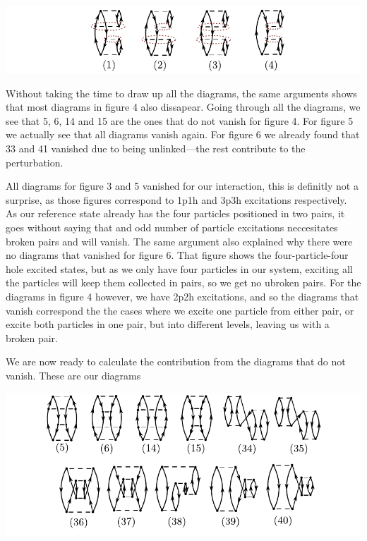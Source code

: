 \documentclass[a4paper, 11pt, notitlepage, english]{article}
\begin{document}
\includegraphics[width=\textwidth]{project2_6}

Without taking the time to draw up all the diagrams, the same arguments shows that most diagrams in figure 4 also dissapear. Going through all the diagrams, we see that 5, 6, 14 and 15 are the ones that do not vanish for figure 4. For figure 5 we actually see that all diagrams vanish again. For figure 6 we already found that 33 and 41 vanished due to being unlinked---the rest contribute to the perturbation.

All diagrams for figure 3 and 5 vanished for our interaction, this is definitly not a surprise, as those figures correspond to 1p1h and 3p3h excitations respectively. As our reference state already has the four particles positioned in two pairs, it goes without saying that and odd number of particle excitations neccesitates broken pairs and will vanish. The same argument also explained why there were no diagrams that vanished for figure 6. That figure shows the four-particle-four hole excited states, but as we only have four particles in our system, exciting all the particles will keep them collected in pairs, so we get no ubroken pairs. For the diagrams in figure 4 however, we have 2p2h excitations, and so the diagrams that vanish correspond the the cases where we excite one particle from either pair, or excite both particles in one pair, but into different levels, leaving us with a broken pair.

\clearpage

We are now ready to calculate the contribution from the diagrams that do not vanish. These are our diagrams

\includegraphics[width=\textwidth]{project2_7}
\end{document}
